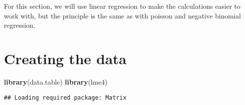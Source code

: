\documentclass[]{book}
\newenvironment{Shaded}{\begin{snugshade}}{\end{snugshade}}
\newcommand{\KeywordTok}[1]{\textcolor[rgb]{0.13,0.29,0.53}{\textbf{#1}}}
\newcommand{\NormalTok}[1]{#1}
\begin{document}
For this section, we will use linear regression to make the calculations
easier to work with, but the principle is the same as with poisson and
negative binomial regression.

\section{Creating the data}\label{creating-the-data}

\begin{Shaded}
\begin{Highlighting}[]
\KeywordTok{library}\NormalTok{(data.table)}
\KeywordTok{library}\NormalTok{(lme4)}
\end{Highlighting}
\end{Shaded}

\begin{verbatim}
## Loading required package: Matrix
\end{verbatim}
\end{document}
